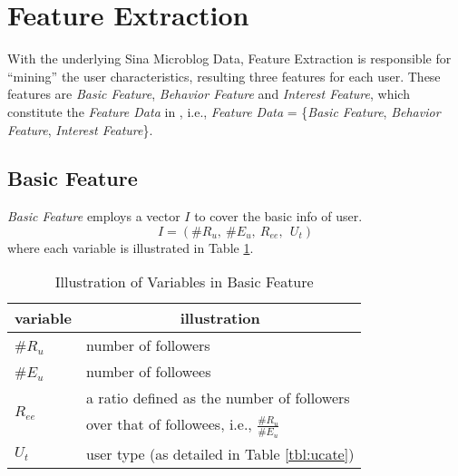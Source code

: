 

\section{Feature Extraction}
\label{sec:fe}

With the underlying Sina Microblog Data, Feature Extraction is responsible for ``mining'' the user characteristics, resulting three features for each user.
These features are \textit{Basic Feature}, \textit{Behavior Feature} and \textit{Interest Feature}, which constitute the \textit{Feature Data} in \sys{}, i.e., \textit{Feature Data} = \{\textit{Basic Feature}, \textit{Behavior Feature}, \textit{Interest Feature}\}.

\subsection{Basic Feature}

\textit{Basic Feature} employs a vector $I$ to cover the basic info of user.
\begin{equation}
\label{eq:info}
	I = (\#R_u,\ \#E_u,\ R_{ee},\ \ U_t)
\end{equation}
where each variable is illustrated in Table \ref{tbl:fe-info}.

\begin{table}[tb!]
\centering
\begin{small}
\caption{Illustration of Variables in Basic Feature}
\vspace{0.3cm}
\label{tbl:fe-info}
\begin{tabular}{ll}
\toprule
\multicolumn{1}{c}{\textbf{variable}} & \multicolumn{1}{c}{\textbf{illustration}}	\\	\midrule \midrule
\#$R_u$				& number of followers				\\	\midrule
\#$E_u$				& number of followees				\\	\midrule
\multirow{4}{*}{$R_{ee}$} & \multirow{2}{*}{a ratio defined as the number of followers} \\
                   &                     \\
                   & \multirow{2}{*}{over that of followees, i.e., $\frac{\#R_u}{\#E_u}$} \\
                   & 						\\	\midrule
$U_t$					& user type (as detailed in Table \ref{tbl:ucate})			\\ \bottomrule
\end{tabular}
\end{small}
\end{table}


